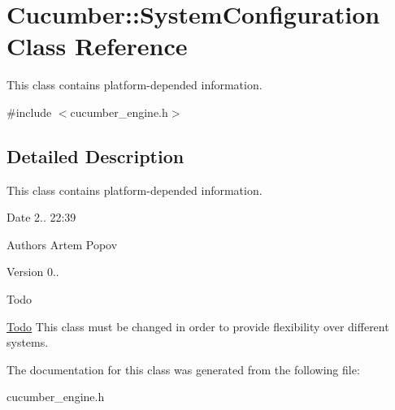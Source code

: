 \hypertarget{classCucumber_1_1SystemConfiguration}{}\section{Cucumber\+:\+:System\+Configuration Class Reference}
\label{classCucumber_1_1SystemConfiguration}


This class contains platform-\/depended information.  




{\ttfamily \#include $<$cucumber\+\_\+engine.\+h$>$}



\subsection{Detailed Description}
This class contains platform-\/depended information. 

\begin{DoxyDate}{Date}
2.. 22\+:39 
\end{DoxyDate}
\begin{DoxyAuthor}{Authors}
Artem Popov 
\end{DoxyAuthor}
\begin{DoxyVersion}{Version}
0..
\end{DoxyVersion}
\begin{DoxyRefDesc}{Todo}
\item[\hyperlink{todo__todo000001}{Todo}]This class must be changed in order to provide flexibility over different systems. \end{DoxyRefDesc}


The documentation for this class was generated from the following file\+:\begin{DoxyCompactItemize}
\item 
cucumber\+\_\+engine.\+h\end{DoxyCompactItemize}
